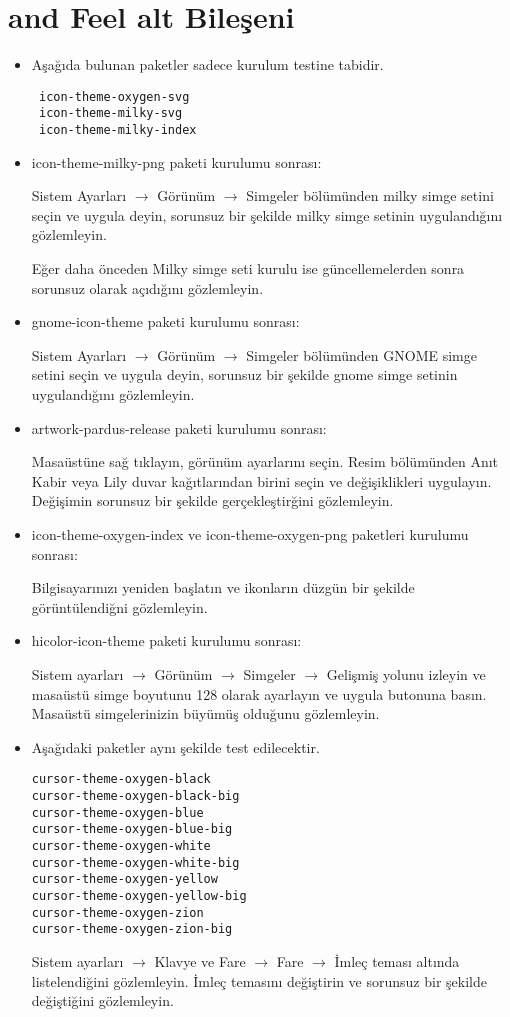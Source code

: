 \documentclass[a4paper,10pt]{article}
\begin{document}
\section{
 and Feel alt Bileşeni}
\begin{itemize}
\item Aşağıda bulunan paketler sadece kurulum testine tabidir.
\begin{verbatim}
 icon-theme-oxygen-svg
 icon-theme-milky-svg
 icon-theme-milky-index
\end{verbatim}

\item icon-theme-milky-png paketi kurulumu sonrası:

Sistem Ayarları $\rightarrow$ Görünüm $\rightarrow$ Simgeler bölümünden milky simge setini seçin ve uygula deyin, sorunsuz bir şekilde milky simge setinin uygulandığını gözlemleyin.

Eğer daha önceden Milky simge seti kurulu ise güncellemelerden sonra sorunsuz olarak açıdığını gözlemleyin.

\item gnome-icon-theme paketi kurulumu sonrası:

Sistem Ayarları $\rightarrow$ Görünüm $\rightarrow$ Simgeler bölümünden GNOME simge setini seçin ve uygula deyin, sorunsuz bir şekilde gnome simge setinin uygulandığını gözlemleyin.

\item artwork-pardus-release paketi kurulumu sonrası:

Masaüstüne sağ tıklayın, görünüm ayarlarını seçin. Resim bölümünden Anıt Kabir veya Lily duvar kağıtlarından birini seçin ve değişiklikleri uygulayın. Değişimin sorunsuz bir şekilde gerçekleştirğini gözlemleyin.

\item icon-theme-oxygen-index ve icon-theme-oxygen-png paketleri kurulumu sonrası: 

Bilgisayarınızı yeniden başlatın ve ikonların düzgün bir şekilde görüntülendiğni gözlemleyin.

\item hicolor-icon-theme paketi kurulumu sonrası:

Sistem ayarları $\rightarrow$ Görünüm $\rightarrow$ Simgeler $\rightarrow$ Gelişmiş yolunu izleyin ve masaüstü simge boyutunu 128 olarak ayarlayın ve uygula butonuna basın. Masaüstü simgelerinizin büyümüş olduğunu gözlemleyin.

 \item Aşağıdaki paketler aynı şekilde test edilecektir.
\begin{verbatim}
cursor-theme-oxygen-black
cursor-theme-oxygen-black-big
cursor-theme-oxygen-blue
cursor-theme-oxygen-blue-big
cursor-theme-oxygen-white
cursor-theme-oxygen-white-big
cursor-theme-oxygen-yellow
cursor-theme-oxygen-yellow-big
cursor-theme-oxygen-zion
cursor-theme-oxygen-zion-big
\end{verbatim}

Sistem ayarları $\rightarrow$  Klavye ve Fare $\rightarrow$ Fare $\rightarrow$ İmleç teması altında listelendiğini gözlemleyin. İmleç temasını değiştirin ve sorunsuz bir şekilde değiştiğini gözlemleyin.

\end{itemize}
\end{document}
